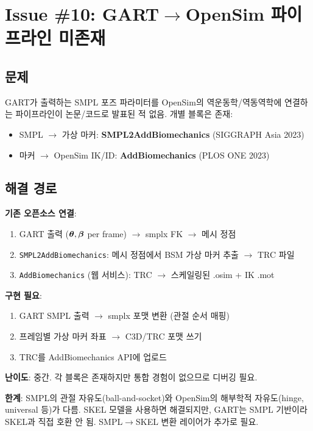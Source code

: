 \documentclass[11pt, a4paper]{report}
\begin{document}
\section{Issue \#10: GART$\rightarrow$OpenSim 파이프라인 미존재}

\subsection{문제}
GART가 출력하는 SMPL 포즈 파라미터를 OpenSim의 역운동학/역동역학에 연결하는 파이프라인이 논문/코드로 발표된 적 없음. 개별 블록은 존재:
\begin{itemize}[leftmargin=*]
  \item SMPL $\rightarrow$ 가상 마커: \textbf{SMPL2AddBiomechanics} (SIGGRAPH Asia 2023)
  \item 마커 $\rightarrow$ OpenSim IK/ID: \textbf{AddBiomechanics} (PLOS ONE 2023)
\end{itemize}

\subsection{해결 경로}

\begin{ossbox}
\textbf{기존 오픈소스 연결}:
\begin{enumerate}[leftmargin=*]
  \item GART 출력 ($\bm{\theta}, \bm{\beta}$ per frame) $\rightarrow$ smplx FK $\rightarrow$ 메시 정점
  \item \texttt{SMPL2AddBiomechanics}: 메시 정점에서 BSM 가상 마커 추출 $\rightarrow$ TRC 파일
  \item \texttt{AddBiomechanics} (웹 서비스): TRC $\rightarrow$ 스케일링된 .osim + IK .mot
\end{enumerate}
\end{ossbox}

\begin{devbox}
\textbf{구현 필요}:
\begin{enumerate}[leftmargin=*]
  \item GART SMPL 출력 $\rightarrow$ smplx 포맷 변환 (관절 순서 매핑)
  \item 프레임별 가상 마커 좌표 $\rightarrow$ C3D/TRC 포맷 쓰기
  \item TRC를 AddBiomechanics API에 업로드
\end{enumerate}
\textbf{난이도}: 중간. 각 블록은 존재하지만 통합 경험이 없으므로 디버깅 필요.
\end{devbox}

\begin{limitbox}
\textbf{한계}: SMPL의 관절 자유도(ball-and-socket)와 OpenSim의 해부학적 자유도(hinge, universal 등)가 다름. SKEL 모델을 사용하면 해결되지만, GART는 SMPL 기반이라 SKEL과 직접 호환 안 됨. SMPL$\rightarrow$SKEL 변환 레이어가 추가로 필요.
\end{limitbox}
\end{document}

